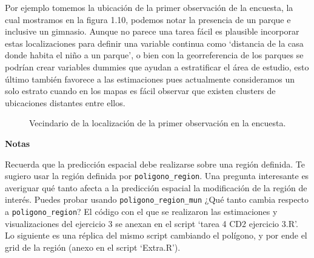 \documentclass[paper=letter, fontsize=11pt]{scrartcl}
\numberwithin{equation}{section} %
\numberwithin{figure}{section} %
\numberwithin{table}{section} %
\begin{document}
\begin{enumerate}
\begin{enumerate}
Por ejemplo tomemos la ubicación de la primer observación de la encuesta, la cual mostramos en la figura 1.10, podemos notar la presencia de un parque e inclusive un gimnasio. Aunque no parece una tarea fácil es plausible incorporar estas localizaciones para definir una variable continua como ‘distancia de la casa donde habita el niño a un parque’, o bien con la georreferencia de los parques se podrían crear variables dummies que ayudan a estratificar el área de estudio, esto último también favorece a las estimaciones pues actualmente consideramos un solo estrato cuando en los mapas es fácil observar que existen clusters de ubicaciones distantes entre ellos. \\


\begin{figure}[htbp]
\caption{Vecindario de la localización de la primer observación en la encuesta.}
\label{img1}
\end{figure}
\FloatBarrier





  



\end{enumerate}  
\end{enumerate}
\textbf{Notas}
\bigskip

Recuerda que la predicción espacial debe realizarse sobre una región definida. Te sugiero usar la región definida por \verb|poligono_region|. Una pregunta interesante es averiguar qué tanto afecta a la predicción espacial la modificación de la región de interés. Puedes probar usando \verb|poligono_region_mun| ¿Qué tanto cambia respecto a \verb|poligono_region|?
El código con el que se realizaron las estimaciones y visualizaciones del ejercicio 3 se anexan en el script ‘tarea 4 CD2 ejercicio 3.R’. Lo siguiente es una réplica del mismo script cambiando el polígono, y por ende el grid de la región (anexo en el script ‘Extra.R’). \\
\end{document}
